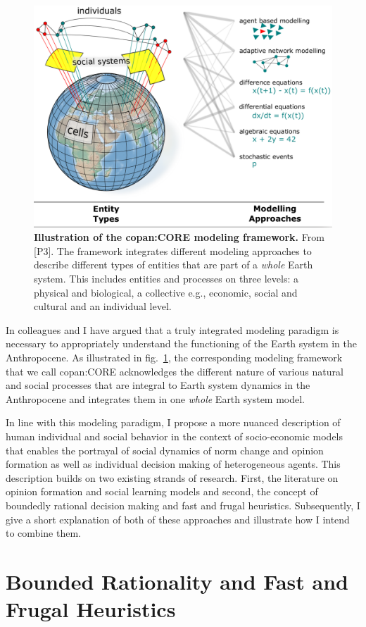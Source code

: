 \begin{figure}[t]
  \centering
  \includegraphics[width = .8 \textwidth]{figures/CORE.png}
  \caption[Illustration of the copan:CORE modeling framework]{\textbf{Illustration of the copan:CORE modeling framework.} From [P3]. The framework integrates different modeling approaches to describe different types of entities that are part of a \emph{whole} Earth system. This includes entities and processes on three levels: a physical and biological, a collective e.g., economic, social and cultural and an individual level.}
  \label{fig:Core}
\end{figure}
In \citep{Donges2018} colleagues and I have argued that a truly integrated modeling paradigm is necessary to appropriately understand the functioning of the Earth system in the Anthropocene. As illustrated in fig.~\ref{fig:Core}, the corresponding modeling framework that we call copan:CORE acknowledges the different nature of various natural and social processes that are integral to Earth system dynamics in the Anthropocene and integrates them in one \emph{whole} Earth system model.

In line with this modeling paradigm, I propose a more nuanced description of human individual and social behavior in the context of socio-economic models that enables the portrayal of social dynamics of norm change and opinion formation as well as individual decision making of heterogeneous agents. 
This description builds on two existing strands of research. First, the literature on opinion formation and social learning models and second, the concept of boundedly rational decision making and fast and frugal heuristics. Subsequently, I give a short explanation of both of these approaches and illustrate how I intend to combine them.

\section{Bounded Rationality and Fast and Frugal Heuristics}
\label{sec:intro_bounded_rationality} 

